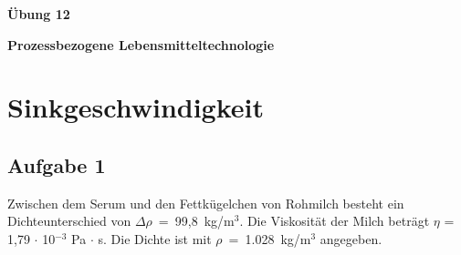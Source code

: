 \documentclass[a4paper,11pt]{article}
\begin{document}


\bckgrnd


\begin{center}
\LARGE
\color{white}
\textbf{Übung 12} \par \vspace*{2mm}
\large \color{miugray} \textbf{Prozessbezogene Lebensmitteltechnologie}
\end{center}
\par 
\vspace*{6mm}


\color{miudiutex}
\section*{Sinkgeschwindigkeit}

\subsection*{Aufgabe 1}
Zwischen dem Serum und den Fettkügelchen von Rohmilch besteht ein Dichteunterschied
von \mbox{$\Delta \rho$ = 99,8 kg/m$^3$.} Die Viskosität der Milch beträgt $\eta$ = 1,79 $\cdot$ 10$^{-3}$ Pa $\cdot$ s. Die Dichte ist mit \mbox{$\rho$ = 1.028 kg/m$^3$} angegeben. 
\end{document}
